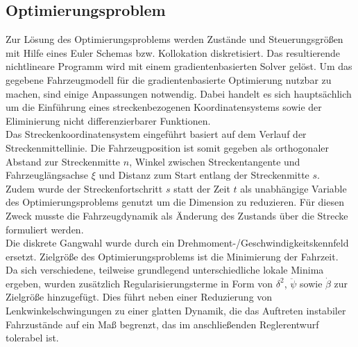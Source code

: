 \documentclass[pdf]{ifacconf}
\begin{document}
\subsection{Optimierungsproblem}
Zur Lösung des Optimierungsproblems werden Zustände und Steuerungsgrößen mit Hilfe eines Euler Schemas bzw. Kollokation diskretisiert. Das resultierende nichtlineare Programm wird mit einem gradientenbasierten Solver gelöst. Um das gegebene Fahrzeugmodell für die gradientenbasierte Optimierung nutzbar zu machen, sind einige Anpassungen notwendig. Dabei handelt es sich hauptsächlich um die Einführung eines streckenbezogenen Koordinatensystems sowie der Eliminierung nicht differenzierbarer Funktionen.\\
Das Streckenkoordinatensystem eingeführt basiert auf dem Verlauf der Streckenmittellinie. Die Fahrzeugposition ist somit gegeben als orthogonaler Abstand zur Streckenmitte $n$, Winkel zwischen Streckentangente und Fahrzeuglängsachse $\xi$ und Distanz zum Start entlang der Streckenmitte $s$.\\ Zudem wurde der Streckenfortschritt $s$ statt der Zeit $t$ als unabhängige Variable des Optimierungsproblems genutzt um die Dimension zu reduzieren. Für diesen Zweck musste die Fahrzeugdynamik als Änderung des Zustands über die Strecke formuliert werden.\\
Die diskrete Gangwahl wurde durch ein Drehmoment-/Geschwindigkeitskennfeld ersetzt. Zielgröße des Optimierungsproblems ist die Minimierung der Fahrzeit.  \\
Da sich verschiedene, teilweise grundlegend unterschiedliche lokale Minima ergeben, wurden zusätzlich Regularisierungsterme in Form von $\delta^2$, $\ddot{\psi}$ sowie $\dot{\beta}$ zur Zielgröße hinzugefügt. Dies führt neben einer Reduzierung von Lenkwinkelschwingungen zu einer glatten Dynamik, die das Auftreten instabiler Fahrzustände auf ein Maß begrenzt, das im anschließenden Reglerentwurf tolerabel ist. \\
\end{document}
